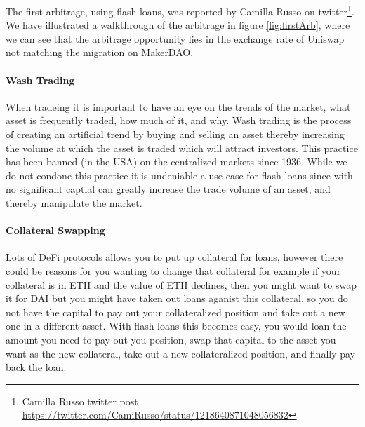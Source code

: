 The first arbitrage, using flash loans, was reported by Camilla Russo on twitter\footnote{Camilla Russo twitter post \url{https://twitter.com/CamiRusso/status/1218640871048056832}}. We have illustrated a walkthrough of the arbitrage in figure \ref{fig:firstArb}, where we can see that the arbitrage opportunity lies in the exchange rate of Uniswap not matching the migration on MakerDAO.

\paragraph{Wash Trading} When tradeing it is important to have an eye on the trends of the market, what asset is frequently traded, how much of it, and why. Wash trading is the process of creating an artificial trend by buying and selling an asset thereby increasing the volume at which the asset is traded which will attract investors. This practice has been banned (in the USA) on the centralized markets since 1936. While we do not condone this practice it is undeniable a use-case for flash loans since with no significant captial can greatly increase the trade volume of an asset, and thereby manipulate the market.

\paragraph{Collateral Swapping} Lots of DeFi protocols allows you to put up collateral for loans, however there could be reasons for you wanting to change that collateral for example if your collateral is in ETH and the value of ETH declines, then you might want to swap it for DAI but you might have taken out loans aganist this collateral, so you do not have the capital to pay out your collateralized position and take out a new one in a different asset. With flash loans this becomes easy, you would loan the amount you need to pay out you position, swap that capital to the asset you want as the new collateral, take out a new collateralized position, and finally pay back the loan.